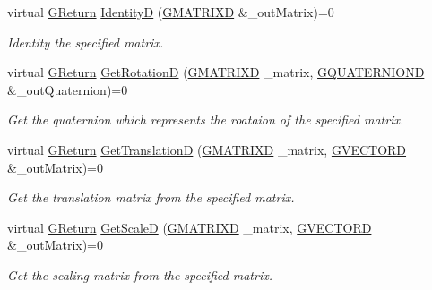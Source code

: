 \begin{DoxyCompactItemize}
virtual \mbox{\hyperlink{namespace_g_w_a67a839e3df7ea8a5c5686613a7a3de21}{G\+Return}} \mbox{\hyperlink{class_g_w_1_1_m_a_t_h_1_1_g_matrix_a3b7136d0cbc99d1a29d159838b5e1d91}{IdentityD}} (\mbox{\hyperlink{struct_g_w_1_1_m_a_t_h_1_1_g_m_a_t_r_i_x_d}{G\+M\+A\+T\+R\+I\+XD}} \&\+\_\+out\+Matrix)=0
\begin{DoxyCompactList}\small\item\em Identity the specified matrix. \end{DoxyCompactList}\item 
virtual \mbox{\hyperlink{namespace_g_w_a67a839e3df7ea8a5c5686613a7a3de21}{G\+Return}} \mbox{\hyperlink{class_g_w_1_1_m_a_t_h_1_1_g_matrix_aa8a09092d814d7599f2ddedb6a34d1ea}{Get\+RotationD}} (\mbox{\hyperlink{struct_g_w_1_1_m_a_t_h_1_1_g_m_a_t_r_i_x_d}{G\+M\+A\+T\+R\+I\+XD}} \+\_\+matrix, \mbox{\hyperlink{struct_g_w_1_1_m_a_t_h_1_1_g_q_u_a_t_e_r_n_i_o_n_d}{G\+Q\+U\+A\+T\+E\+R\+N\+I\+O\+ND}} \&\+\_\+out\+Quaternion)=0
\begin{DoxyCompactList}\small\item\em Get the quaternion which represents the roataion of the specified matrix. \end{DoxyCompactList}\item 
virtual \mbox{\hyperlink{namespace_g_w_a67a839e3df7ea8a5c5686613a7a3de21}{G\+Return}} \mbox{\hyperlink{class_g_w_1_1_m_a_t_h_1_1_g_matrix_a2b2dd5bfce9dc5f567a793ab2a21bb07}{Get\+TranslationD}} (\mbox{\hyperlink{struct_g_w_1_1_m_a_t_h_1_1_g_m_a_t_r_i_x_d}{G\+M\+A\+T\+R\+I\+XD}} \+\_\+matrix, \mbox{\hyperlink{struct_g_w_1_1_m_a_t_h_1_1_g_v_e_c_t_o_r_d}{G\+V\+E\+C\+T\+O\+RD}} \&\+\_\+out\+Matrix)=0
\begin{DoxyCompactList}\small\item\em Get the translation matrix from the specified matrix. \end{DoxyCompactList}\item 
virtual \mbox{\hyperlink{namespace_g_w_a67a839e3df7ea8a5c5686613a7a3de21}{G\+Return}} \mbox{\hyperlink{class_g_w_1_1_m_a_t_h_1_1_g_matrix_a1d8d370c39617b8ad0fcfb42459fcb09}{Get\+ScaleD}} (\mbox{\hyperlink{struct_g_w_1_1_m_a_t_h_1_1_g_m_a_t_r_i_x_d}{G\+M\+A\+T\+R\+I\+XD}} \+\_\+matrix, \mbox{\hyperlink{struct_g_w_1_1_m_a_t_h_1_1_g_v_e_c_t_o_r_d}{G\+V\+E\+C\+T\+O\+RD}} \&\+\_\+out\+Matrix)=0
\begin{DoxyCompactList}\small\item\em Get the scaling matrix from the specified matrix. \end{DoxyCompactList}\item 

\end{DoxyCompactItemize}
